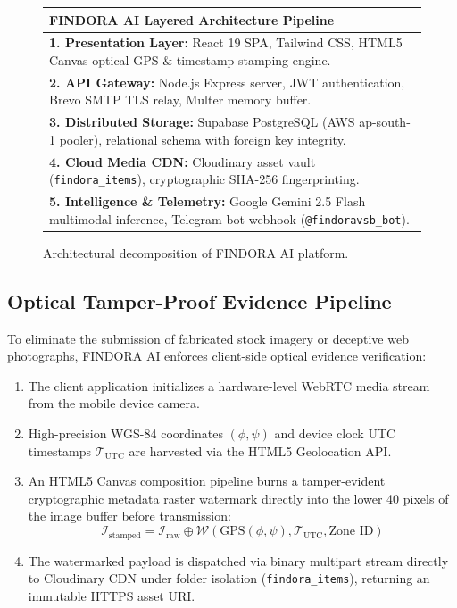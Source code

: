 \documentclass[conference]{IEEEtran}
\begin{document}
\begin{figure}[htbp]
\centering
\small
\setlength{\tabcolsep}{4pt}
\begin{tabular}{|p{}|}
\hline
\textbf{FINDORA AI Layered Architecture Pipeline} \\
\hline
\textbf{1. Presentation Layer:} React 19 SPA, Tailwind CSS, HTML5 Canvas optical GPS \& timestamp stamping engine. \\
\textbf{2. API Gateway:} Node.js Express server, JWT authentication, Brevo SMTP TLS relay, Multer memory buffer. \\
\textbf{3. Distributed Storage:} Supabase PostgreSQL (AWS ap-south-1 pooler), relational schema with foreign key integrity. \\
\textbf{4. Cloud Media CDN:} Cloudinary asset vault (\texttt{findora\_items}), cryptographic SHA-256 fingerprinting. \\
\textbf{5. Intelligence \& Telemetry:} Google Gemini 2.5 Flash multimodal inference, Telegram bot webhook (\texttt{@findoravsb\_bot}). \\
\hline
\end{tabular}
\caption{Architectural decomposition of FINDORA AI platform.}
\label{fig:architecture}
\end{figure}

\subsection{Optical Tamper-Proof Evidence Pipeline}
To eliminate the submission of fabricated stock imagery or deceptive web photographs, FINDORA AI enforces client-side optical evidence verification:
\begin{enumerate}
    \item The client application initializes a hardware-level WebRTC media stream from the mobile device camera.
    \item High-precision WGS-84 coordinates $(\phi, \psi)$ and device clock UTC timestamps $\mathcal{T}_{\text{UTC}}$ are harvested via the HTML5 Geolocation API.
    \item An HTML5 Canvas composition pipeline burns a tamper-evident cryptographic metadata raster watermark directly into the lower 40 pixels of the image buffer before transmission:
    \begin{equation}
        \mathcal{I}_{\text{stamped}} = \mathcal{I}_{\text{raw}} \oplus \mathcal{W}\left(\text{GPS}(\phi, \psi), \mathcal{T}_{\text{UTC}}, \text{Zone ID}\right)
    \end{equation}
    \item The watermarked payload is dispatched via binary multipart stream directly to Cloudinary CDN under folder isolation (\texttt{findora\_items}), returning an immutable HTTPS asset URI.
\end{enumerate}
\end{document}

